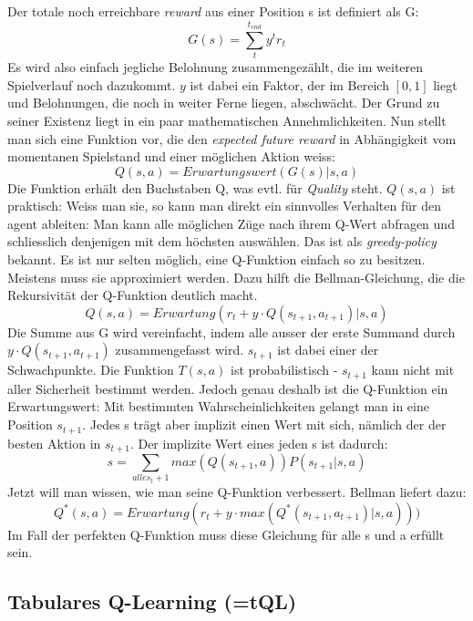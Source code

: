 \documentclass[12pt,a4paper]{article}
\begin{document}
Der totale noch erreichbare \textit{reward} aus einer Position s ist definiert als G:
$$G(s) = \sum_{t}^{t_{end}} y^t r_t $$
Es wird also einfach jegliche Belohnung zusammengezählt, die im weiteren Spielverlauf noch dazukommt. $y$ ist dabei ein Faktor, der im Bereich $[0,1]$ liegt und Belohnungen, die noch in weiter Ferne liegen, abschwächt. Der Grund zu seiner Existenz liegt in ein paar mathematischen Annehmlichkeiten\cite[siehe][Value Function]{lilblog}.
Nun stellt man sich eine Funktion vor, die den \textit{expected future reward} in Abhängigkeit vom momentanen Spielstand und einer möglichen Aktion weiss:
$$Q(s,a) = Erwartungswert( G(s) | s,a )$$
Die Funktion erhält den Buchstaben Q, was evtl. für \textit{Quality} steht. $Q(s,a)$ ist praktisch: Weiss man sie, so kann man direkt ein sinnvolles Verhalten für den agent ableiten: Man kann alle möglichen Züge nach ihrem Q-Wert abfragen und schliesslich denjenigen mit dem höchsten auswählen. Das ist als \textit{greedy-policy} bekannt.
Es ist nur selten möglich, eine Q-Funktion einfach so zu besitzen. Meistens muss sie approximiert werden. Dazu hilft die Bellman-Gleichung, die die Rekursivität der Q-Funktion deutlich macht.
$$Q(s,a) = Erwartung(r_t + y \cdot Q(s_{t+1},a_{t+1}) | s,a )$$
Die Summe aus G wird vereinfacht, indem alle ausser der erste Summand durch $y \cdot Q(s_{t+1},a_{t+1})$ zusammengefasst wird. $s_{t+1}$ ist dabei einer der Schwachpunkte. Die Funktion $T(s,a)$ ist probabilistisch - $s_{t+1}$ kann nicht mit aller Sicherheit bestimmt werden. Jedoch genau deshalb ist die Q-Funktion ein Erwartungswert: Mit bestimmten Wahrscheinlichkeiten gelangt man in eine Position $s_{t+1}$. Jedes s trägt aber implizit einen Wert mit sich, nämlich der der besten Aktion in $s_{t+1}$. Der implizite Wert eines jeden s ist dadurch:
$$ s =  \sum_{alle s_t+1} max( Q(s_{t+1},a) ) P(s_{t+1} | s,a)$$
Jetzt will man wissen, wie man seine Q-Funktion verbessert. Bellman liefert dazu:
$$Q^*(s,a) = Erwartung(r_t + y \cdot max(Q^*(s_{t+1},a_{t+1}) | s,a )) )$$
Im Fall der perfekten Q-Funktion muss diese Gleichung für alle s und a erfüllt sein.

\subsection{Tabulares Q-Learning (=tQL)}
\end{document}
